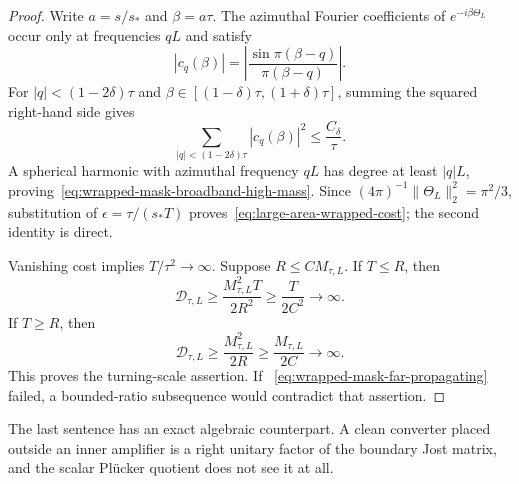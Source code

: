 \documentclass[11pt]{article}
\theoremstyle{definition}
\theoremstyle{remark}
\begin{document}
\begin{proof}
Write $a=s/s_*$ and $\beta=a\tau$.  The azimuthal Fourier coefficients of
$e^{-i\beta\Theta_L}$ occur only at frequencies $qL$ and satisfy
\begin{equation}
 |c_q(\beta)|
 =\left|\frac{\sin\pi(\beta-q)}{\pi(\beta-q)}\right|.
 \label{eq:large-area-wrapped-Fourier-coefficients}
\end{equation}
For $|q|<(1-2\delta)\tau$ and
$\beta\in[(1-\delta)\tau,(1+\delta)\tau]$, summing the squared right-hand side
gives
\begin{equation}
 \sum_{|q|<(1-2\delta)\tau}|c_q(\beta)|^2
 \leq \frac{C_\delta}{\tau}.
\end{equation}
A spherical harmonic with azimuthal frequency $qL$ has degree at least
$|q|L$, proving~\eqref{eq:wrapped-mask-broadband-high-mass}.  Since
$(4\pi)^{-1}\|\Theta_L\|_2^2=\pi^2/3$, substitution of
$\epsilon=\tau/(s_*T)$ proves~\eqref{eq:large-area-wrapped-cost}; the second
identity is direct.

Vanishing cost implies $T/\tau^2\to\infty$.  Suppose
$R\leq C M_{\tau,L}$.  If $T\leq R$, then
\begin{equation}
 \mathcal D_{\tau,L}
 \geq\frac{M_{\tau,L}^2T}{2R^2}
 \geq\frac{T}{2C^2}\longrightarrow\infty.
\end{equation}
If $T\geq R$, then
\begin{equation}
 \mathcal D_{\tau,L}
 \geq\frac{M_{\tau,L}^2}{2R}
 \geq\frac{M_{\tau,L}}{2C}\longrightarrow\infty.
\end{equation}
This proves the turning-scale assertion.  If
~\eqref{eq:wrapped-mask-far-propagating} failed, a bounded-ratio subsequence
would contradict that assertion.
\end{proof}

The last sentence has an exact algebraic counterpart.  A clean converter
placed outside an inner amplifier is a right unitary factor of the boundary
Jost matrix, and the scalar Pl\"ucker quotient does not see it at all.
\end{document}
